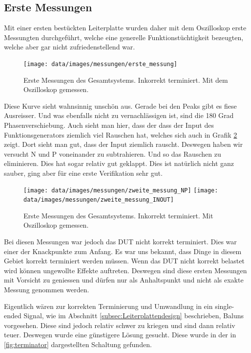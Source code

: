 \subsection{Erste Messungen}

Mit einer ersten bestückten Leiterplatte wurden daher mit dem Oszilloskop erste Messungten durchgeführt, welche eine generelle Funktionstüchtigkeit bezeugten, welche aber gar nicht zufriedenstellend war.

\begin{figure}[H]
\begin{center}
    \texttt{[image: data/images/messungen/erste\_messung]}
    \caption{Erste Messungen des Gesamtsystems. Inkorrekt terminiert. Mit dem Oszilloskop gemessen.}
    \label{fig:messungen_erste}
\end{center}
\end{figure}

Diese Kurve sieht wahnsinnig unschön aus. Gerade bei den Peaks gibt es fiese Ausreisser. Und was ebenfalls nicht zu vernachlässigen ist, sind die 180 Grad Phasenverschiebung.
Auch sieht man hier, dass der dass der Input des Funktionsgenerators ziemlich viel Rauschen hat, welches sich auch in Grafik \ref{fig:messungen_zweite} zeigt.
Dort sieht man gut, dass der Input ziemlich rauscht. Deswegen haben wir versucht N und P voneinander zu subtrahieren. Und so das Rauschen zu eliminieren. Dies hat sogar relativ gut geklappt. Dies ist natürlich nicht ganz sauber, ging aber für eine erste Verifikation sehr gut.

\begin{figure}[H]
\begin{center}
    \texttt{[image: data/images/messungen/zweite\_messung\_NP]}
    \texttt{[image: data/images/messungen/zweite\_messung\_INOUT]}
    \caption{Erste Messungen des Gesamtsystems. Inkorrekt terminiert. Mit Oszilloskop gemessen.}
    \label{fig:messungen_zweite}
\end{center}
\end{figure}

Bei diesen Messungen war jedoch das DUT nicht korrekt terminiert. Dies war einer der Knackpunkte zum Anfang. Es war uns bekannt, dass Dinge in diesem Gebiet korrekt terminiert werden müssen. Wenn das DUT nicht korrekt belastet wird können ungewollte Effekte auftreten. Deswegen sind diese ersten Messungen mit Vorsicht zu geniessen und dürfen nur als Anhaltspunkt und nicht als exakte Messung genommen werden.

Eigentlich wären zur korrekten Terminierung und Umwandlung in ein single-ended Signal, wie im Abschnitt \ref{subsec:Leiterplattendesign} beschrieben, Baluns vorgesehen. Diese sind jedoch relativ schwer zu kriegen und sind dann relativ teuer. Deswegen wurde eine günstigere Lösung gesucht. Diese wurde in der in \ref{fig:terminator} dargestellten Schaltung gefunden.

